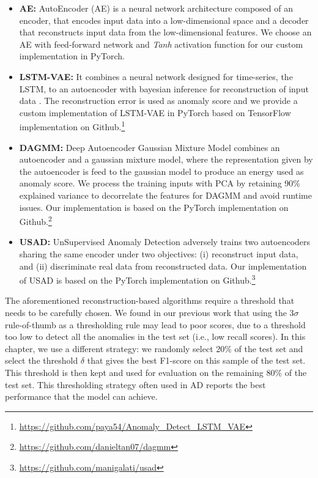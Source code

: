 \begin{itemize}
    \item \textbf{AE:} AutoEncoder (AE) is a neural network architecture composed of an encoder, that encodes input data into a low-dimensional space and a decoder that reconstructs input data from the low-dimensional features. We choose an AE with feed-forward network and \textit{Tanh} activation function for our custom implementation in PyTorch.%
    \item \textbf{LSTM-VAE:} It combines a neural network designed for time-series, the LSTM, to an autoencoder with bayesian inference for reconstruction of input data \cite{park2018multimodal}. The reconstruction error is used as anomaly score and we provide a custom implementation of LSTM-VAE in PyTorch based on TensorFlow implementation on Github.\footnote{\url{https://github.com/paya54/Anomaly\_Detect\_LSTM\_VAE}} %
    \item \textbf{DAGMM:} Deep Autoencoder Gaussian Mixture Model combines an autoencoder and a gaussian mixture model, where the representation given by the autoencoder is feed to the gaussian model to produce an energy used as anomaly score. We process the training inputs with PCA by retaining 90\% explained variance to decorrelate the features for DAGMM and avoid runtime issues. Our implementation is based on the PyTorch implementation on Github.\footnote{\url{https://github.com/danieltan07/dagmm}} %
    \item \textbf{USAD:} UnSupervised Anomaly Detection \cite{audibert2020usad} adversely trains two autoencoders sharing the same encoder under two objectives: (i) reconstruct input data, and (ii) discriminate real data from reconstructed data. Our implementation of USAD is based on the PyTorch implementation on Github.\footnote{\url{https://github.com/manigalati/usad}} %
\end{itemize}



The aforementioned reconstruction-based algorithms require a threshold that needs to be carefully chosen. We found in our previous work \cite{Ky2022} that using the $3\sigma$ rule-of-thumb as a thresholding rule may lead to poor scores, due to a threshold too low to detect all the anomalies in the test set (i.e., low recall scores). In this chapter, we use a different strategy: we randomly select $20\%$ of the test set and select the threshold $\delta$ that gives the best F1-score on this sample of the test set. This threshold is then kept and used for evaluation on the remaining $80\%$ of the test set. This thresholding strategy often used in AD \cite{zong2018deep, audibert2020usad} reports the best performance that the model can achieve. 

